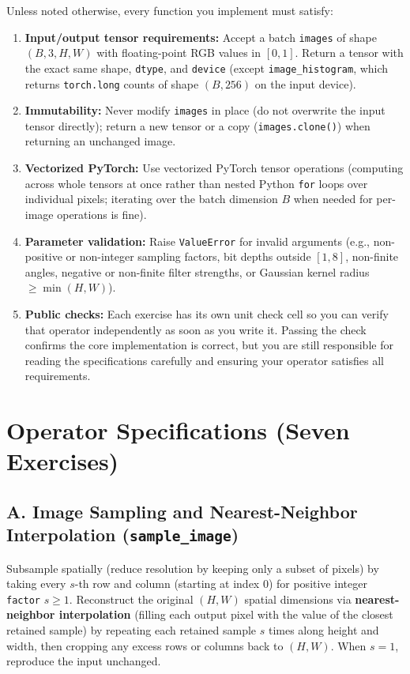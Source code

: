 \documentclass[11pt,letterpaper]{article}
\newcommand{\code}[1]{\texttt{\textcolor{primary}{#1}}}
\begin{document}
Unless noted otherwise, every function you implement must satisfy:
\begin{enumerate}
  \item \textbf{Input/output tensor requirements:} Accept a batch \code{images} of shape $(B, 3, H, W)$ with floating-point RGB values in $[0, 1]$. Return a tensor with the exact same shape, \code{dtype}, and \code{device} (except \code{image\_histogram}, which returns \code{torch.long} counts of shape $(B, 256)$ on the input device).
  \item \textbf{Immutability:} Never modify \code{images} in place (do not overwrite the input tensor directly); return a new tensor or a copy (\code{images.clone()}) when returning an unchanged image.
  \item \textbf{Vectorized PyTorch:} Use vectorized PyTorch tensor operations (computing across whole tensors at once rather than nested Python \code{for} loops over individual pixels; iterating over the batch dimension $B$ when needed for per-image operations is fine).
  \item \textbf{Parameter validation:} Raise \code{ValueError} for invalid arguments (e.g., non-positive or non-integer sampling factors, bit depths outside $[1, 8]$, non-finite angles, negative or non-finite filter strengths, or Gaussian kernel radius $\ge \min(H, W)$).
  \item \textbf{Public checks:} Each exercise has its own unit check cell so you can verify that operator independently as soon as you write it. Passing the check confirms the core implementation is correct, but you are still responsible for reading the specifications carefully and ensuring your operator satisfies all requirements.
\end{enumerate}

\clearpage
\section{Operator Specifications (Seven Exercises)}

\subsection{A. Image Sampling and Nearest-Neighbor Interpolation (\code{sample\_image})}
Subsample spatially (reduce resolution by keeping only a subset of pixels) by taking every $s$-th row and column (starting at index $0$) for positive integer \code{factor} $s \ge 1$. Reconstruct the original $(H, W)$ spatial dimensions via \textbf{nearest-neighbor interpolation} (filling each output pixel with the value of the closest retained sample) by repeating each retained sample $s$ times along height and width, then cropping any excess rows or columns back to $(H, W)$. When $s = 1$, reproduce the input unchanged.
\end{document}
